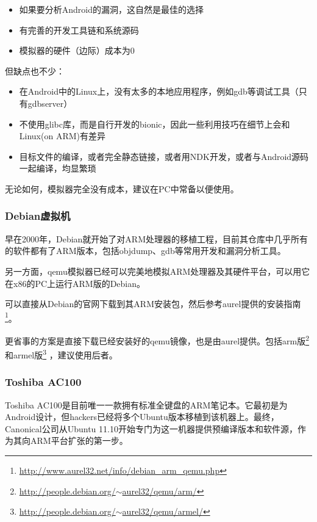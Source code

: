 \begin{itemize}
\item 如果要分析Android的漏洞，这自然是最佳的选择
\item 有完善的开发工具链和系统源码
\item 模拟器的硬件（边际）成本为0
\end{itemize}

但缺点也不少：

\begin{itemize}
\item 在Android中的Linux上，没有太多的本地应用程序，例如gdb等调试工具（只有gdbserver）
\item 不使用glibc库，而是自行开发的bionic，因此一些利用技巧在细节上会和Linux(on ARM)有差异
\item 目标文件的编译，或者完全静态链接，或者用NDK开发，或者与Android源码一起编译，均显繁琐
\end{itemize}

无论如何，模拟器完全没有成本，建议在PC中常备以便使用。

\subsubsection{Debian虚拟机}
早在2000年，Debian就开始了对ARM处理器的移植工程，目前其仓库中几乎所有的软件都有了ARM版本，包括objdump、gdb等常用开发和漏洞分析工具。

另一方面，qemu模拟器已经可以完美地模拟ARM处理器及其硬件平台，可以用它在x86的PC上运行ARM版的Debian。

可以直接从Debian的官网下载到其ARM安装包，然后参考aurel提供的安装指南\footnote{\href{http://www.aurel32.net/info/debian\_arm\_qemu.php}{http://www.aurel32.net/info/debian\_arm\_qemu.php}}。

更省事的方案是直接下载已经安装好的qemu镜像，也是由aurel提供。包括arm版\footnote{\href{http://people.debian.org/~aurel32/qemu/arm/}{http://people.debian.org/$\sim$aurel32/qemu/arm/}}
和armel版\footnote{\href{http://people.debian.org/~aurel32/qemu/armel/}{http://people.debian.org/$\sim$aurel32/qemu/armel/}}
，建议使用后者。

\subsubsection{Toshiba AC100}
Toshiba AC100是目前唯一一款拥有标准全键盘的ARM笔记本。它最初是为Android设计，但hackers已经将多个Ubuntu版本移植到该机器上。最终，Canonical公司从Ubuntu 11.10开始专门为这一机器提供预编译版本和软件源，作为其向ARM平台扩张的第一步。

